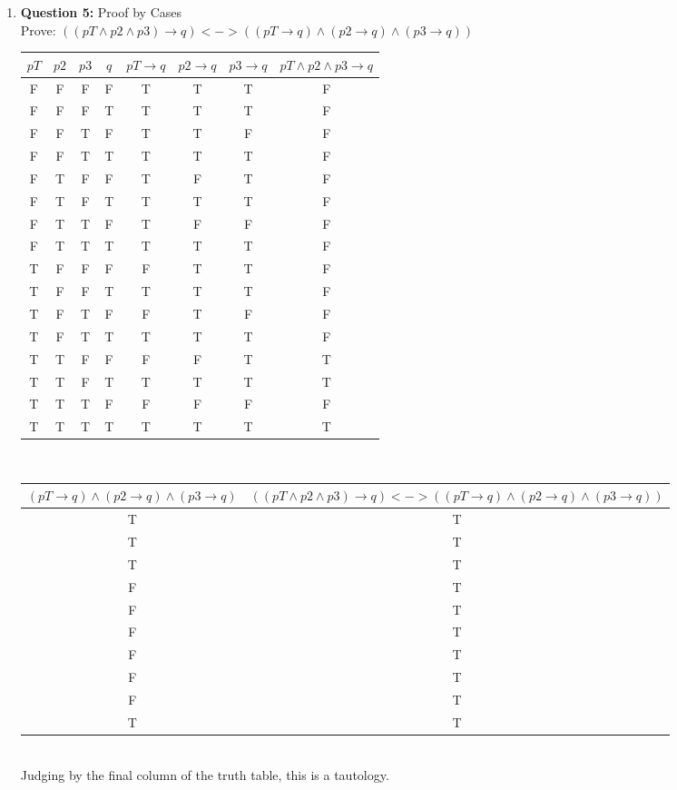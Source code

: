 \documentclass[11pt]{article}
\begin{document}
\begin{enumerate}
\item 
\textbf{Question 5:} Proof by Cases \\
Prove: $((pT \land p2 \land p3) \to q) <-> ((pT \to q) \land (p2 \to q) \land (p3 \to q))$ \\
\begin{tabular}{|c|c|c|c|c|c|c|c|}
    \hline
    $pT$ & $p2$ & $p3$ & $q$ & $pT \to q$ & $p2 \to q$ & $p3 \to q$ & $pT \land p2 \land p3 \to q$ \\
    \hline
    F & F & F & F & T & T & T & F\\
    \hline
    F & F & F & T & T & T & T & F\\
    \hline
    F & F & T & F & T & T & F & F\\
    \hline
    F & F & T & T & T & T & T & F\\
    \hline
    F & T & F & F & T & F & T & F\\
    \hline
    F & T & F & T & T & T & T & F\\
    \hline
    F & T & T & F & T & F & F & F\\
    \hline
    F & T & T & T & T & T & T & F\\
    \hline
    T & F & F & F & F & T & T & F\\
    \hline
    T & F & F & T & T & T & T & F\\
    \hline
    T & F & T & F & F & T & F & F\\
    \hline
    T & F & T & T & T & T & T & F\\
    \hline
    T & T & F & F & F & F & T & T\\
    \hline
    T & T & F & T & T & T & T & T\\
    \hline
    T & T & T & F & F & F & F & F\\
    \hline
    T & T & T & T & T & T & T & T\\
    \hline
\end{tabular} \\
\begin{tabular}{|c|c|}
    \hline
    $(pT \to q) \land (p2 \to q) \land (p3 \to q)$ & $((pT \land p2 \land p3) \to q) <-> ((pT \to q) \land (p2 \to q) \land (p3 \to q))$ \\
    \hline
    T & T \\
    \hline
    T & T \\
    \hline
    T&T \\
    \hline
    F&T \\
    \hline
    F&T \\
    \hline
    F&T \\
    \hline
    F&T \\
    \hline
    F&T \\
    \hline
    F&T \\
    \hline
    T&T \\
    \hline
\end{tabular}\\
Judging by the final column of the truth table, this is a tautology.
\end{enumerate}
\end{document}
